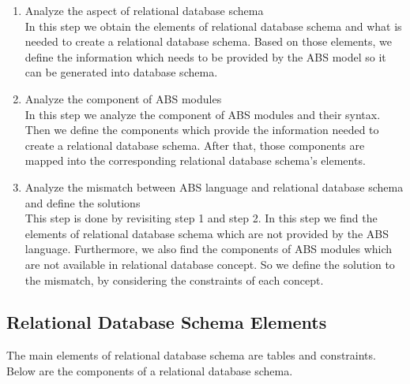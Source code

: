 \documentclass[runningheads,a4paper]{llncs}
\begin{document}
\begin{enumerate}
	\item Analyze the aspect of relational database schema\\
	In this step we obtain the elements of relational database schema and what is needed to create a relational database schema. Based on those elements, we define the information which needs to be provided by the ABS model so it can be generated into database schema.
	\item Analyze the component of ABS modules\\
	In this step we analyze the component of ABS modules and their syntax. Then we define the components which provide the information needed to create a relational database schema. After that, those components are mapped into the corresponding relational database schema’s elements.
	\item Analyze the mismatch between ABS language and relational database schema and define the solutions\\
	This step is done by revisiting step 1 and step 2. In this step we find the elements of relational database schema which are not provided by the ABS language. Furthermore, we also find the components of ABS modules which are not available in relational database concept. So we define the solution to the mismatch, by considering the constraints of each concept.
\end{enumerate}

\subsection{Relational Database Schema Elements}
The main elements of relational database schema are tables and constraints. Below are the components of a relational database schema.
\end{document}
